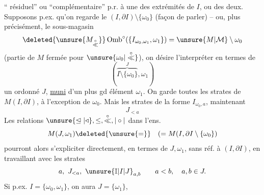 
`` résiduel'' ou ``complémentaire'' p.r. à une des extrémités de $I$, ou des deux. Supposons p.ex.  qu'on regarde le $(I,\partial I)\setminus\{\omega_0\}$ (façon de parler) -- ou, plus précisément, le sous-magasin
\[
\deleted{\unsure{M_{\overset{\circ}{\ll}}}}\operatorname{Omb}^{\circ}(\{I_{\omega_0,\omega_1},\omega_1\})=\unsure{M|\mathcal M}\setminus\omega_0
\]
(partie de $M$ fermée pour $\unsure{\omega_0|\overset{\circ}{\ll}}$), on désire l'interpréter en termes de
\[
(\overbrace{I\setminus\{\omega_0\}}^J,\omega_1)
\]
un ordonné $J$, \uline{muni} d'un plus gd élément $\omega_1$. On garde toutes les strates de $M(I,\partial I)$, à l'exception de $\omega_0$. Mais les strates de la forme  $I_{\omega_0,a}$,  maintenant
\[
J_{<a}
\]
Les relations $\unsure{\trianglelefteq|\triangleleft},\leq,\overset{\circ}{\ll},\mathrel{|\circ|}$  dans l'ens.
\[
M(J,\omega_1)\deleted{\unsure{=}}\quad(=M(I,\partial I\setminus\{\omega_0\})
\]
pourront alors s'expliciter directement, en termes de $J,\omega_1$, sans réf.  à $(I,\partial I)$, en travaillant avec les strates
\[
a,\ J_{<a},\ \unsure{\mathbb I|I|J}_{a,b}\qquad a<b,\quad a,b\in J.
\]
Si p.ex. $I=\{\omega_0,\omega_1\}$, on aura $J=\{\omega_1\}$,
